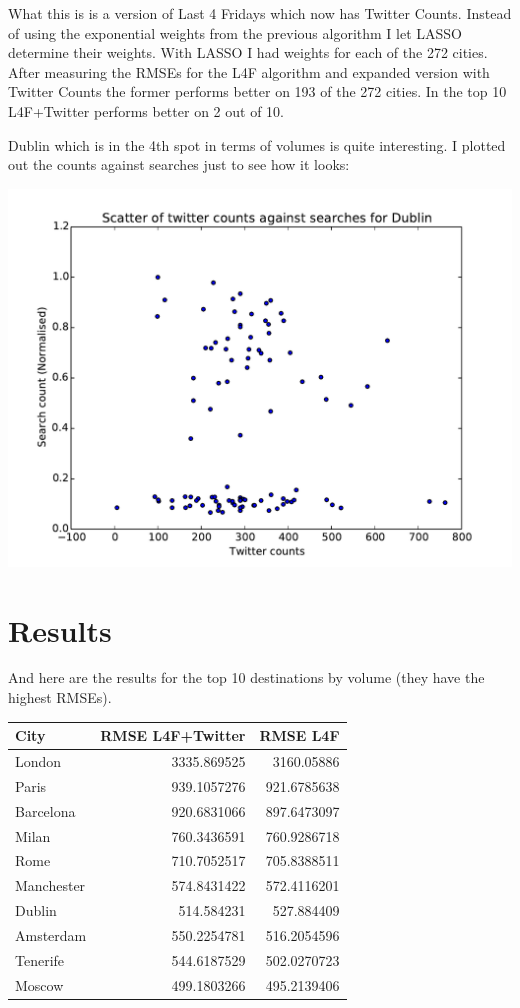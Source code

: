 \documentclass[minf,frontabs,twoside,singlespacing,parskip]{infthesis}
\begin{document}
What this is is a version of Last 4 Fridays which now has Twitter Counts. Instead of using the exponential weights from the previous algorithm I let LASSO determine their weights.
With LASSO I had weights for each of the 272 cities. After measuring the RMSEs for the L4F algorithm and expanded version with Twitter Counts the former performs better on 193 of the 272 cities. In the top 10 L4F+Twitter performs better on 2 out of 10. 

Dublin which is in the 4th spot in terms of volumes is quite interesting. I plotted out the counts against searches just to see how it looks:

\includegraphics[width=\textwidth]{Dublin}  

\newpage
\section{Results}

And here are the results for the top 10 destinations by volume (they have the highest RMSEs).

\begin{tabular}{ l | r | r }
City	& RMSE L4F+Twitter &RMSE L4F \\
\hline
London & 3335.869525 & 3160.05886 \\
Paris	 & 939.1057276 & 921.6785638  \\
Barcelona & 920.6831066 & 897.6473097  \\
Milan & 760.3436591 & 760.9286718  \\
Rome & 710.7052517 & 705.8388511  \\
Manchester & 574.8431422 & 572.4116201  \\
Dublin & 514.584231	 & 527.884409  \\
Amsterdam & 550.2254781 & 516.2054596  \\
Tenerife & 544.6187529 & 502.0270723  \\
Moscow & 499.1803266 & 495.2139406  \\
\end{tabular}
\end{document}
